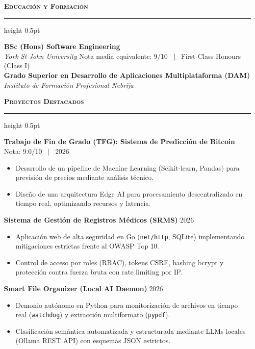 \documentclass[10pt,a4paper]{article}
\newcommand{\cvsection}[1]{%
  \vspace{0.45em}%
  {\large\textbf{\textsc{#1}}}\\[-0.5em]%
  {\color{primary}\hrule height 0.5pt}%
  \vspace{0.35em}%
}
\begin{document}
\cvsection{Educación y Formación}
\textbf{BSc (Hons) Software Engineering}\\
\textit{York St John University} \hfill Nota media equivalente: 9/10 \ $\vert$ \ First-Class Honours (Class I)\\[0.2em]
\textbf{Grado Superior en Desarrollo de Aplicaciones Multiplataforma (DAM)}\\
\textit{Instituto de Formación Profesional Nebrija}

\cvsection{Proyectos Destacados}
\textbf{Trabajo de Fin de Grado (TFG): Sistema de Predicción de Bitcoin} \hfill Nota: 9.0/10 \ $\vert$ \ 2026
\begin{itemize}[leftmargin=1.2em, itemsep=1.2pt, topsep=1.5pt]
  \item Desarrollo de un pipeline de Machine Learning (Scikit-learn, Pandas) para previsión de precios mediante análisis técnico.
  \item Diseño de una arquitectura Edge AI para procesamiento descentralizado en tiempo real, optimizando recursos y latencia.
\end{itemize}

\vspace{0.15em}
\textbf{Sistema de Gestión de Registros Médicos (SRMS)} \hfill 2026
\begin{itemize}[leftmargin=1.2em, itemsep=1.2pt, topsep=1.5pt]
  \item Aplicación web de alta seguridad en Go (\texttt{net/http}, SQLite) implementando mitigaciones estrictas frente al OWASP Top 10.
  \item Control de acceso por roles (RBAC), tokens CSRF, hashing bcrypt y protección contra fuerza bruta con rate limiting por IP.
\end{itemize}

\vspace{0.15em}
\textbf{Smart File Organizer (Local AI Daemon)} \hfill 2026
\begin{itemize}[leftmargin=1.2em, itemsep=1.2pt, topsep=1.5pt]
  \item Demonio autónomo en Python para monitorización de archivos en tiempo real (\texttt{watchdog}) y extracción multiformato (\texttt{pypdf}).
  \item Clasificación semántica automatizada y estructurada mediante LLMs locales (Ollama REST API) con esquemas JSON estrictos.
\end{itemize}
\end{document}
